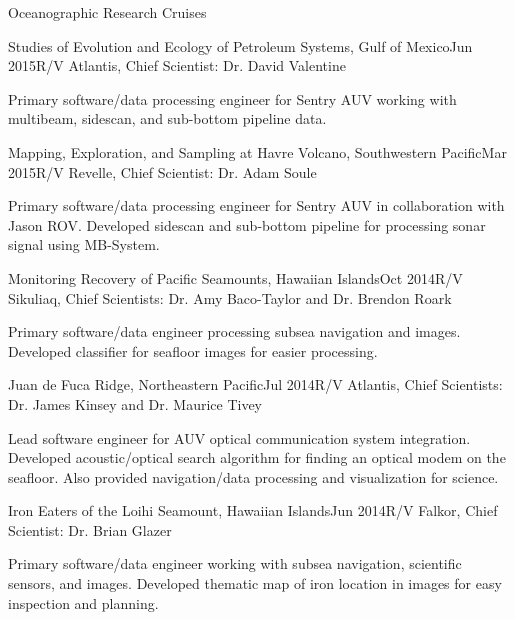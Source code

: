 \documentclass{resume} %
\begin{document}
\begin{rSection}{Oceanographic Research Cruises}

\begin{rSubsection}{Studies of Evolution and Ecology of Petroleum Systems, Gulf of Mexico}{Jun 2015}{R/V Atlantis, Chief Scientist: Dr. David Valentine}{}
\item{Primary software/data processing engineer for Sentry AUV working with multibeam, sidescan, and sub-bottom pipeline data.}
\end{rSubsection}

\begin{rSubsection}{Mapping, Exploration, and Sampling at Havre Volcano, Southwestern Pacific}{Mar 2015}{R/V Revelle, Chief Scientist: Dr. Adam Soule}{}
\item{Primary software/data processing engineer for Sentry AUV in collaboration with Jason ROV. Developed sidescan and sub-bottom pipeline for processing sonar signal using MB-System.}
\end{rSubsection}

\begin{rSubsection}{Monitoring Recovery of Pacific Seamounts, Hawaiian Islands}{Oct 2014}{R/V Sikuliaq, Chief Scientists: Dr. Amy Baco-Taylor and Dr. Brendon Roark}{}
\item{Primary software/data engineer processing subsea navigation and images. Developed classifier for seafloor images for easier processing.}
\end{rSubsection}

\begin{rSubsection}{Juan de Fuca Ridge, Northeastern Pacific}{Jul 2014}{R/V Atlantis, Chief Scientists: Dr. James Kinsey and Dr. Maurice Tivey}{}
\item{Lead software engineer for AUV optical communication system integration. Developed acoustic/optical search algorithm for finding an optical modem on the seafloor. Also provided navigation/data processing and visualization for science.}
\end{rSubsection}

\begin{rSubsection}{Iron Eaters of the Loihi Seamount, Hawaiian Islands}{Jun 2014}{R/V Falkor, Chief Scientist: Dr. Brian Glazer}{}
\item{Primary software/data engineer working with subsea navigation, scientific sensors, and images. Developed thematic map of iron location in images for easy inspection and planning. }
\end{rSubsection}


\end{rSection}
\end{document}
